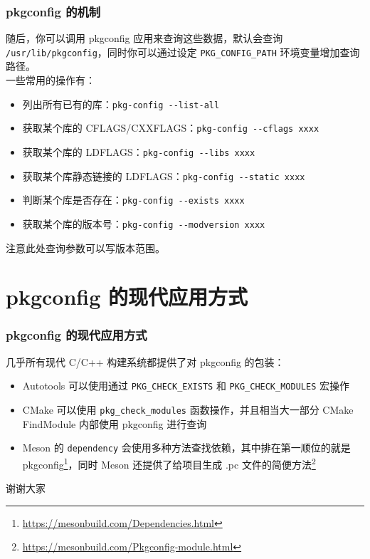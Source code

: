 \documentclass[UTF-8]{ctexbeamer}
\begin{document}
\begin{frame}[fragile]
	\frametitle{pkgconfig 的机制}
	
	随后，你可以调用 pkgconfig 应用来查询这些数据，默认会查询 \verb|/usr/lib/pkgconfig|，同时你可以通过设定 \verb|PKG_CONFIG_PATH| 环境变量增加查询路径。\\
	
	一些常用的操作有：
	\begin{itemize}
		\item 列出所有已有的库：\verb|pkg-config --list-all|
		\item 获取某个库的 CFLAGS/CXXFLAGS：\verb|pkg-config --cflags xxxx|
		\item 获取某个库的 LDFLAGS：\verb|pkg-config --libs xxxx|
		\item 获取某个库静态链接的 LDFLAGS：\verb|pkg-config --static xxxx|
		\item 判断某个库是否存在：\verb|pkg-config --exists xxxx|
		\item 获取某个库的版本号：\verb|pkg-config --modversion xxxx|
	\end{itemize}
	注意此处查询参数可以写版本范围。
\end{frame}

\section{pkgconfig 的现代应用方式}
\begin{frame}[fragile]
	\frametitle{pkgconfig 的现代应用方式}
	
	几乎所有现代 C/C++ 构建系统都提供了对 pkgconfig 的包装：
	\begin{itemize}
		\item Autotools 可以使用通过 \verb|PKG_CHECK_EXISTS| 和 \verb|PKG_CHECK_MODULES| 宏操作
		\item CMake 可以使用 \verb|pkg_check_modules| 函数操作，并且相当大一部分 CMake FindModule 内部使用 pkgconfig 进行查询
		\item Meson 的 \verb|dependency| 会使用多种方法查找依赖，其中排在第一顺位的就是 pkgconfig\footnote{\url{https://mesonbuild.com/Dependencies.html}}，同时 Meson 还提供了给项目生成 .pc 文件的简便方法\footnote{\url{https://mesonbuild.com/Pkgconfig-module.html}}
	\end{itemize}
\end{frame}

\begin{frame}
	\begin{center}
		\huge{谢谢大家}
	\end{center}

\end{frame}
\end{document}
